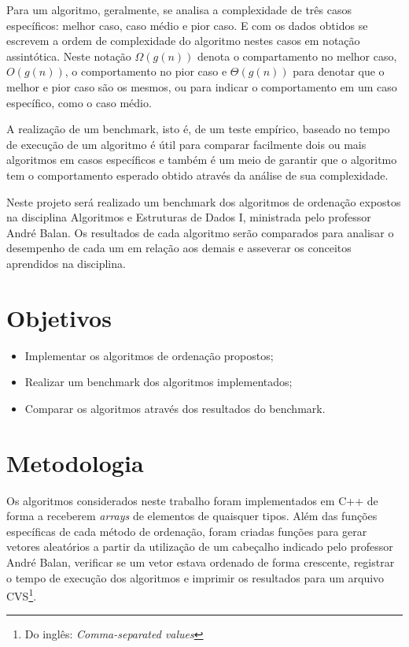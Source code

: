 \documentclass[11pt, brazil, a4paper, usenames, svgnames, dvipsnames]{article}
\begin{document}
Para um algoritmo, geralmente, se analisa a complexidade de três casos específicos:
melhor caso, caso médio e pior caso. E com os dados obtidos se escrevem a ordem de
complexidade do algoritmo nestes casos em notação assintótica. Neste notação $\Omega(g(n))$
denota o compartamento no melhor caso, $O(g(n))$, o comportamento no pior caso e $\Theta(g(n))$ para
denotar que o melhor e pior caso são os mesmos, ou para indicar o comportamento em um
caso específico, como o caso médio.

A realização de um benchmark, isto é, de um teste empírico, baseado no tempo de
execução de um algoritmo é útil para comparar facilmente dois ou mais algoritmos
em casos específicos e também é um meio de garantir que o algoritmo tem o comportamento
esperado obtido através da análise de sua complexidade.

Neste projeto será realizado um benchmark dos algoritmos de ordenação expostos na
disciplina Algoritmos e Estruturas de Dados I, ministrada pelo professor André Balan.
Os resultados de cada algoritmo serão comparados para analisar o desempenho de cada
um em relação aos demais e asseverar os conceitos aprendidos na disciplina.

\noindent
\section{Objetivos}

\hfill

\begin{itemize}
\item Implementar os algoritmos de ordenação propostos;
\item Realizar um benchmark dos algoritmos implementados;
\item Comparar os algoritmos através dos resultados do benchmark.
\end{itemize}

\noindent
\section{Metodologia} \label{metodologia}

\hfill

Os algoritmos considerados neste trabalho foram implementados em C++ de forma
a receberem \textit{arrays} de elementos de quaisquer tipos. Além das funções
específicas de cada método de ordenação, foram criadas funções para gerar
vetores aleatórios a partir da utilização de um cabeçalho indicado pelo professor
André Balan, verificar se um vetor estava ordenado de forma crescente, registrar
o tempo de execução dos algoritmos e imprimir os resultados para um arquivo CVS\footnote{Do inglês: \emph{Comma-separated values}}.
\end{document}
